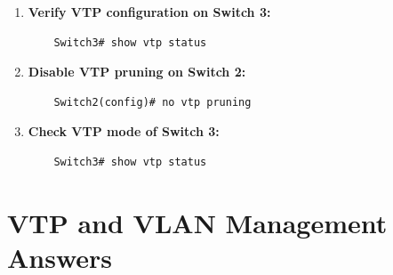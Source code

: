 \documentclass[a4paper]{book}
\begin{document}
\begin{enumerate}
    \item \textbf{Verify VTP configuration on Switch 3:}
    \begin{lstlisting}
    Switch3# show vtp status
    \end{lstlisting}

    \item \textbf{Disable VTP pruning on Switch 2:}
    \begin{lstlisting}
    Switch2(config)# no vtp pruning
    \end{lstlisting}

    \item \textbf{Check VTP mode of Switch 3:}
    \begin{lstlisting}
    Switch3# show vtp status
    \end{lstlisting}
\end{enumerate}

\section{VTP and VLAN Management Answers}
\end{document}

